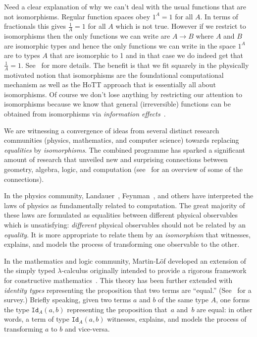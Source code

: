 \documentclass[11pt]{article}
\begin{document}
Need a clear explanation of why we can't deal with the usual functions that
are not isomorphisms. Regular function spaces obey $1^A = 1$ for all $A$. In
terms of fractionals this gives $\frac{1}{A} = 1$ for all $A$ which is not
true. However if we restrict to isomorphisms then the only functions we can
write are $A \rightarrow B$ where $A$ and $B$ are isomorphic types and hence
the only functions we can write in the space $1^A$ are to types $A$ that are
isomorphic to 1 and in that case we do indeed get that $\frac{1}{A} =
1$. See~\cite{fiore-remarks} for more details. The benefit is that we fit
squarely in the physically motivated notion that isomorphisms are the
foundational computational mechanism as well as the HoTT approach that is
essentially all about isomorphisms. Of course we don't lose anything by
restricting our attention to isomorphisms because we know that general
(irreversible) functions can be obtained from isomorphisms via
\emph{information effects}~\cite{James:2012:IE:2103656.2103667}.

We are witnessing a convergence of ideas from several distinct research
communities (physics, mathematics, and computer science) towards replacing
\emph{equalities} by \emph{isomorphisms}. The combined programme has sparked
a significant amount of research that unveiled new and surprising connections
between geometry, algebra, logic, and computation (see~\cite{baez2011physics}
for an overview of some of the connections).

In the physics community, Landauer~\cite{Landauer:1961,Landauer},
Feynman~\cite{springerlink:10.1007/BF02650179}, and others have interpreted
the laws of physics as fundamentally related to computation. The great
majority of these laws are formulated as equalities between different
physical observables which is unsatisfying: \emph{different} physical
observables should not be related by an \emph{equality}. It is more
appropriate to relate them by an \emph{isomorphism} that witnesses, explains,
and models the process of transforming one observable to the other.

In the mathematics and logic community, Martin-L\"of developed an extension
of the simply typed $\lambda$-calculus originally intended to provide a
rigorous framework for constructive
mathematics~\cite{citeulike:7374951}. This theory has been further extended
with \emph{identity types} representing the proposition that two terms are
``equal.'' (See~\cite{streicher,warren} for a survey.) Briefly speaking,
given two terms $a$ and $b$ of the same type $A$, one forms the type
$\texttt{Id}_A(a,b)$ representing the proposition that~$a$ and~$b$ are equal:
in other words, a term of type $\texttt{Id}_A(a,b)$ witnesses, explains, and
models the process of transforming $a$ to $b$ and vice-versa.
\end{document}

